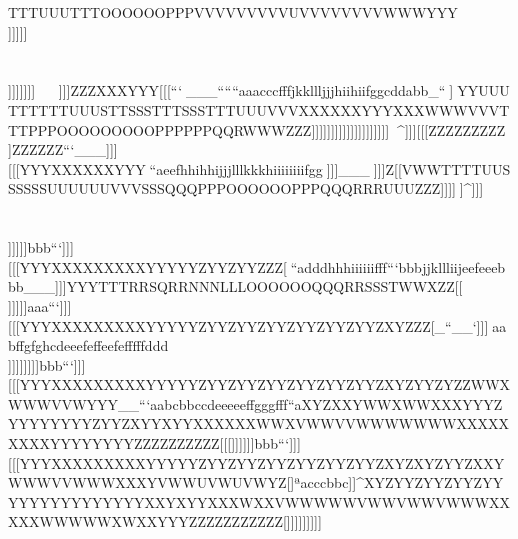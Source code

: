 TTTUUUTTTOOOOOOPPPVVVVVVVVVUVVVVVVVVWWWYYY\\\]]]]]]\\\\\\[[[YYYVVVTTTQQQOOOOOOOOOPPPPPPSSSVVVZZZ\\\]]]]]]]]]^^^^^^^^^^^^^^^^^^]]]ZZZXXXYYY[[[```^^^___``````aaacccfffjkkllljjjhiihiifggcddabb_``^^^]^^YYYUUUTTTTTTUUUSTTSSSTTTSSSTTTUUUVVVXXXXXXYYYXXXWWWVVVTTTPPPOOOOOOOOOPPPPPPQQRWWWZZZ]]]]]]]]]]]]]]]]]]]]^^^^^^^]]][[[ZZZZZZZZZ\\]ZZZZZZ```___]]][[[YYYXXXXXXYYY^^^``aeefhhihhijjjlllkkkhiiiiiiiifgg^^^]]]___^^^]]]Z[[VWWTTTTUUSSSSSSUUUUUUVVVSSSQQQPPPOOOOOOPPPQQQRRRUUUZZZ]]]]^^]]^]]]\\\\\\[[[ZZZYYYYYYYYYZZZZZZZZZZZZZZZZZZZZ[]]]]]]bbb```]]][[[YYYXXXXXXXXXYYYYYZYYZYYZZZ[^^^``adddhhhiiiiiifff```bbbjjkllliijeefeeebbb___]]]YYYTTTRRSQRRNNNLLLOOOOOOQQQRRSSSTWWXZZ[[\\[\\ZZZXYYXXXXXXXXXXXXXXXXXXXXYYYYZZZZZZZZZZZZZZZZZZ[[[]]]]]]aaa```]]][[[YYYXXXXXXXXXYYYYYZYYZYYZYYZYYZYYZYYZXYZZZ[_``__`]]]^^^aabffgfghcdeeefeffeefefffffddd\\\VWWSSTQQRPPQPPPSSSVVVXXXZZZYYZXYZYYYYYYXYYWXXWWWXXXXXXXXXXXYXYYYYYZZZZZZZZZZZZZZZZZ[]]]]]]]]]bbb```]]][[[YYYXXXXXXXXXYYYYYZYYZYYZYYZYYZYYZYYZXYZYYZYZZWWXWWWVVWYYY__```aabcbbccdeeeeeffgggfff``aXYZXXYWWXWWXXXYYYZYYYYYYYYZYYZXYYXYYXXXXXXWWXVWWVVWWWWWWWXXXXXXXXXYYYYYYYYZZZZZZZZZZ[[[]]]]]]bbb```]]][[[YYYXXXXXXXXXYYYYYZYYZYYZYYZYYZYYZYYZXYZXYZYYZXXYWWWVVWWWXXXYVWWUVWUVWYZ[]^^aaacccbbc]]^XYZYYZYYZYYZYYYYYYYYYYYYYYYXXYXYYXXXWXXVWWWWWVWWVWWVWWWXXXXXWWWWWXWXXYYYZZZZZZZZZZZ[]]]]]]]]]